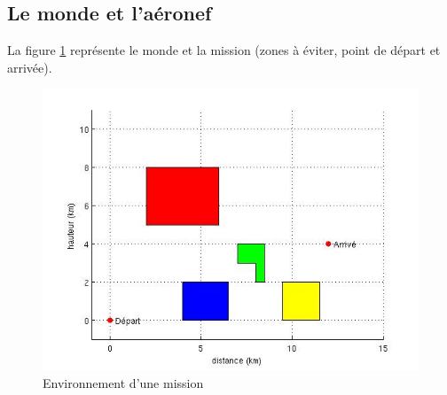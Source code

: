 \subsection{Le monde et l'aéronef}
La figure \ref{fig:scenarioVierge2} représente le monde et la mission (zones à éviter, point de départ et arrivée).
\begin{figure}[h]
	\centering	
	\includegraphics[scale=0.42]{images/scenarioVierge2.jpg}
	\caption{Environnement d'une mission}
	\label{fig:scenarioVierge2}
\end{figure}

